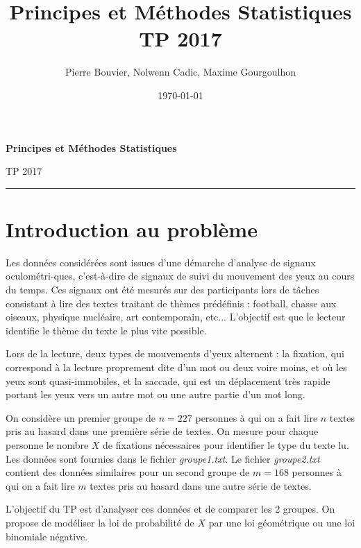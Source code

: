 \documentclass[12pt]{article}
\title{\blue Principes et Méthodes Statistiques \\
\blueb TP 2017}
\author{Pierre Bouvier, Nolwenn Cadic, Maxime Gourgoulhon}
\date{\today}
\newcommand{\noi}{\noindent}
\begin{document}
\maketitle
\baselineskip7mm



\vspace{1cm}


\begin{center}
{\Large \bf Principes et Méthodes Statistiques

\vspace{3mm}

TP 2017

\vspace{3mm}

}
\end{center}

\noi \rule[0.5ex]{\textwidth}{0.1mm}


\section*{Introduction au problème}

Les données considérées sont issues d'une démarche d'analyse de signaux oculométri-ques, c'est-à-dire de signaux de suivi du mouvement des yeux au cours du temps. Ces signaux ont été mesurés sur des participants lors de tâches consistant à lire des textes traitant de thèmes prédéfinis : football, chasse aux oiseaux, physique nucléaire, art contemporain, etc...
L'objectif est que le lecteur identifie le thème du texte le plus vite possible.

Lors de la lecture, deux types de mouvements d'yeux alternent : la fixation, qui correspond à la lecture proprement dite d'un mot ou deux voire moins, et où les yeux sont quasi-immobiles, et la saccade, qui est un déplacement très rapide portant les yeux vers un autre mot ou une autre partie d'un mot long.

On considère un premier groupe de $n=227$ personnes à qui on a fait lire $n$ textes pris au hasard dans une première série de textes. On mesure pour chaque personne le nombre $X$ de fixations nécessaires pour identifier le type du texte lu. Les données sont fournies dans le fichier {\it groupe1.txt}.
Le fichier {\it groupe2.txt} contient des données similaires pour un second groupe de $m=168$ personnes à qui on a fait lire $m$ textes pris au hasard dans une autre série de textes.

L'objectif du TP est d'analyser ces données et de comparer les 2 groupes. On propose de modéliser la loi de probabilité de $X$ par une loi géométrique ou une loi binomiale négative.
\end{document}
